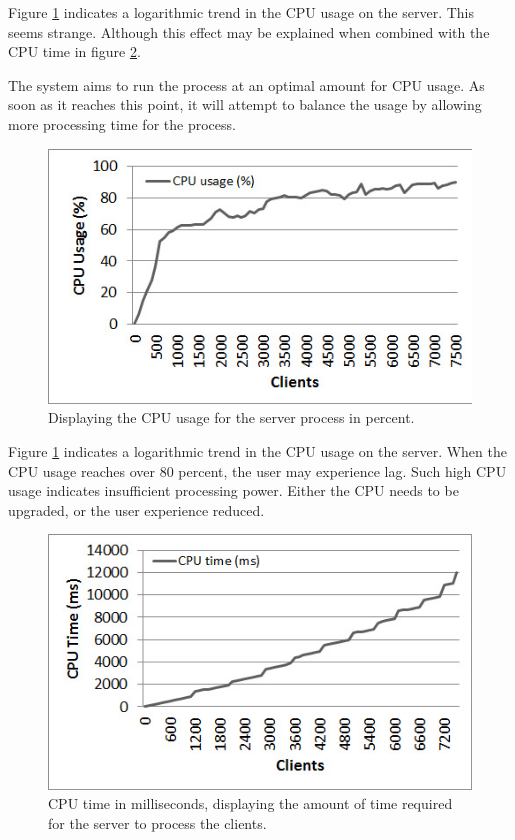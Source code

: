 \documentclass[bsc,frontabs,twoside,singlespacing,parskip,deptreport]{infthesis}     %
\begin{document}
Figure \ref{fig:cpu_usage} indicates a logarithmic trend in the CPU usage on the server. This seems strange. Although this effect may be explained when combined with the CPU time in figure \ref{fig:cpu_time}. 

The system aims to run the process at an optimal amount for CPU usage. As soon as it reaches this point, it will attempt to balance the usage by allowing more processing time for the process.

\begin{figure}[H]
\centering
\includegraphics[scale=0.75]{images/test_CLIENT_CPUusage.jpg}
\caption{Displaying the CPU usage for the server process in percent.}
\label{fig:cpu_usage}
\vspace{1em}
\end{figure}


Figure \ref{fig:cpu_usage} indicates a logarithmic trend in the CPU usage on the server. When the CPU usage reaches over 80 percent, the user may experience lag. Such high CPU usage indicates insufficient processing power. Either the CPU needs to be upgraded, or the user experience reduced.

\begin{figure}[H]
\centering
\includegraphics[scale=0.75]{images/test_CLIENT_CPUtime.jpg}
\caption{CPU time in milliseconds, displaying the amount of time required for the server to process the clients.}
\label{fig:cpu_time}
\end{figure}
\end{document}
